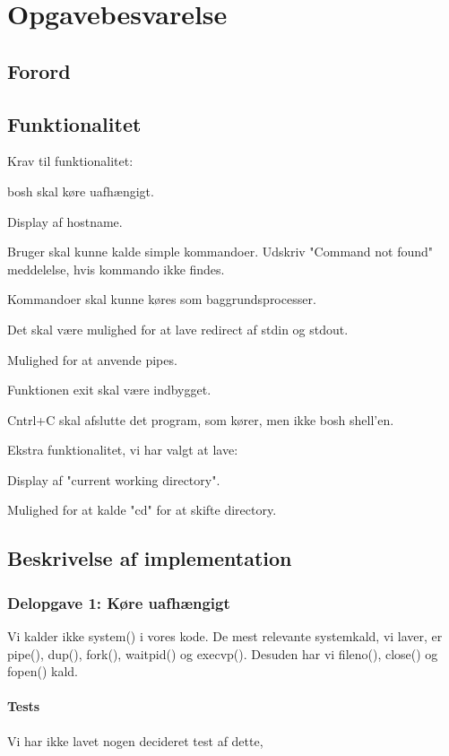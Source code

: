 \chapter{Opgavebesvarelse}
\section{Forord}

\section{Funktionalitet}
Krav til funktionalitet:
\begin{my_enumerate}
\item bosh skal køre uafhængigt.
\item Display af hostname.
\item Bruger skal kunne kalde simple kommandoer. Udskriv "Command not found" meddelelse, hvis kommando ikke findes.
\item Kommandoer skal kunne køres som baggrundsprocesser.
\item Det skal være mulighed for at lave redirect af stdin og stdout.
\item Mulighed for at anvende pipes.
\item Funktionen exit skal være indbygget.
\item Cntrl+C skal afslutte det program, som kører, men ikke bosh shell'en.
\end{my_enumerate}

Ekstra funktionalitet, vi har valgt at lave:
\begin{my_enumerate}
\item Display af "current working directory".
\item Mulighed for at kalde "cd" for at skifte directory.
\end{my_enumerate}

\section{Beskrivelse af implementation}
\subsection{Delopgave 1: Køre uafhængigt}
Vi kalder ikke system() i vores kode. De mest relevante systemkald, vi laver, er pipe(), dup(), fork(), waitpid() og execvp(). Desuden har vi fileno(), close() og fopen() kald.
\subsubsection{Tests}
Vi har ikke lavet nogen decideret test af dette, 
